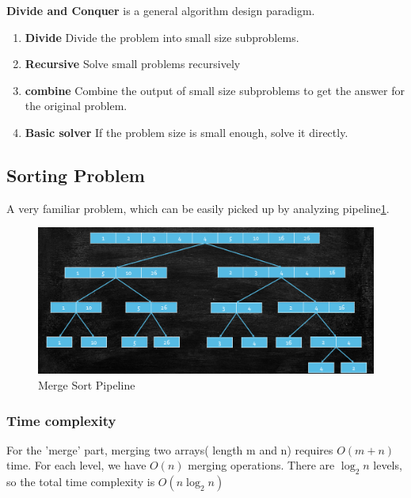 \begin{remark}
    \textbf{Divide and Conquer} is a general algorithm design paradigm.
\begin{enumerate}
    \item \textbf{Divide} Divide the problem into small size subproblems.
    \item \textbf{Recursive} Solve small problems recursively
    \item \textbf{combine}  Combine the output of small size subproblems to get the answer for the original problem.
    \item \textbf{Basic solver} If the problem size is small enough, solve it directly.
\end{enumerate}
\end{remark}

\subsection{Sorting Problem}

A very familiar problem, which can be easily picked up by analyzing pipeline\ref{fig:MergeSort}.
\begin{figure}
    \centering
    \includegraphics[width=0.8\linewidth]{Notes/fig/MergeSort.png}
    \caption{Merge Sort Pipeline}
    \label{fig:MergeSort}
\end{figure}

\subsubsection{Time complexity}
For the 'merge' part, merging two arrays( length m and n) requires $O(m+n)$ time. For each level, we have $O(n)$ merging operations. There are $\log_2n$ levels, so the total time complexity is $O(n\log_2n)$

